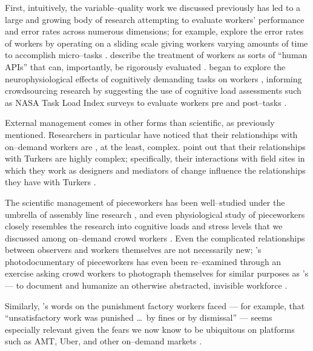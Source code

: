 \documentclass[trackingWork]{subfiles}
\begin{document}
{    First, intuitively, the variable--quality work we discussed previously has led to
    a large and growing body of research attempting to evaluate workers' performance and error rates
    across numerous dimensions;
    for example, \citeauthor{measuringCrowdsourcingCheng} explore the error rates of workers by
    operating on a sliding scale giving workers varying amounts of time to accomplish micro--tasks
    \cite{measuringCrowdsourcingCheng}.
    \citeauthor{storiesIraniSilberman} describe the treatment of workers
    as sorts of ``human APIs'' that can, importantly, be rigorously evaluated
    \cite{storiesIraniSilberman}.
    \citeauthor{gevins2003neurophysiological} began to explore the neurophysiological effects of
    cognitively demanding tasks on workers%
,     informing crowdsourcing research by suggesting the use of cognitive load assessments such as
    NASA Task Load Index surveys to evaluate workers pre and post--tasks
    \cite{embracingErrorKrishna,measuringCrowdsourcingCheng}.


    External management comes in other forms than scientific, as previously mentioned.
    Researchers in particular have noticed that their relationships with on--demand workers are%
,     at the least, complex.
    \citeauthor{storiesIraniSilberman} point out that their relationships with Turkers are highly complex;
    specifically, their interactions with field sites in which they work
    as designers and mediators of change influence the relationships they have with Turkers
    \cite{storiesIraniSilberman}.

    The scientific management of pieceworkers has been well--studied under the umbrella of assembly line research%
,     and even physiological study of pieceworkers closely resembles the
    research into cognitive loads and stress levels that we discussed among on--demand crowd workers
    \cite{hu1961parallel,pieceworkBiologicalHarm}.
    Even the complicated relationships between observers and workers themselves are not necessarily new;
    \citeauthor{riisOtherSideLives}'s photodocumentary of pieceworkers has even been re--examined through an exercise asking crowd workers
    to photograph themselves for similar purposes as \citeauthor{riisOtherSideLives}'s --- to document and humanize an otherwise abstracted, invisible workforce
    \cite{facesOfMechanicalTurk,turkopticon,riisOtherSideLives}.

    Similarly, \citeauthor{pollard1963factory}'s words on the punishment factory workers faced ---
    for example, that ``unsatisfactory work was punished \dots~by fines or by dismissal'' ---
    seems especially relevant given the fears we now know to be ubiquitous on platforms such as AMT, Uber, and other on--demand markets
    \cite{pollard1963factory,uberAlgorithm,dynamo,turkopticon,takingAHITMcInnis}.

}
\end{document}
